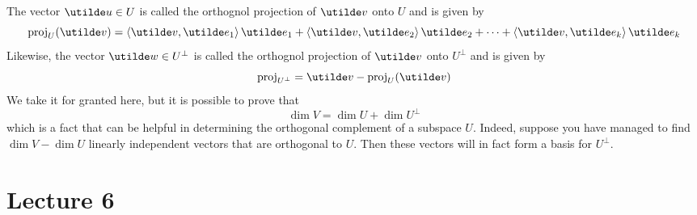 \documentclass{report}
\begin{document}
The vector $\ut{u}\in U$ is called the orthognol projection of $\ut{v}$ onto $U$ and is given by
$$
  \proj_U(\ut{v}) = \brangle{\ut{v},\ut{e}_1}\ut{e}_1 + \brangle{\ut{v},\ut{e}_2}\ut{e}_2 + \dots + \brangle{\ut{v},\ut{e}_k}\ut{e}_k
$$
Likewise, the vector $\ut{w}\in U^\perp$ is called the orthognol projection of $\ut{v}$ onto $U^\perp$ and is given by
$$
  \proj_{U^\perp} = \ut{v} - \proj_U(\ut{v})
$$
We take it for granted here, but it is possible to prove that
$$
  \dim V = \dim U + \dim U^\perp
$$
which is a fact that can be helpful in determining the orthogonal complement of a subspace $U$. Indeed, suppose you have managed to find $\dim V - \dim U$ linearly independent vectors that are orthogonal to $U$. Then these vectors will in fact form a basis for $U^\perp$.

    
\section{Lecture 6}
\end{document}
